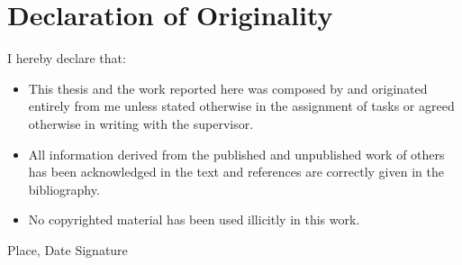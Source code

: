 \chapter{Declaration of Originality}
I hereby declare that:
\begin{itemize}
\item This thesis and the work reported here was composed by and originated entirely from me unless stated otherwise in the assignment of tasks or agreed otherwise in writing with the supervisor.
\item All information derived from the published and unpublished work of others has been acknowledged in the text and references are correctly given in the bibliography. 
\item No copyrighted material has been used illicitly in this work.
\newline
\end{itemize} 
Place, Date \hfill Signature